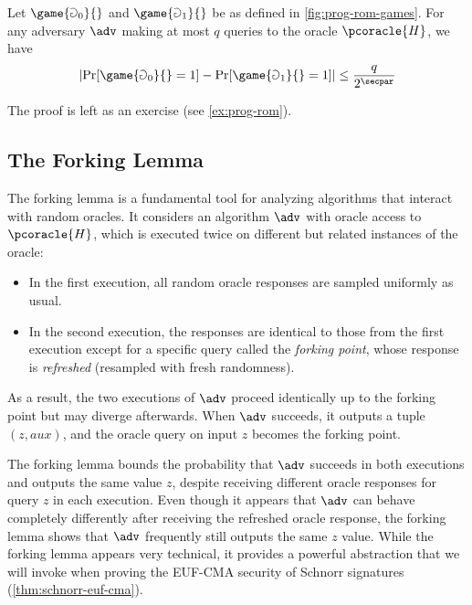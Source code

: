 \begin{proposition}\label{prop:prog-rom}
  Let $\game{\Game_0}{}$ and $\game{\Game_1}{}$ be as defined in \autoref{fig:prog-rom-games}.
  For any adversary $\adv$ making at most $q$ queries to the oracle $\pcoracle{H}$, we have
  \[
  \left|\Pr[\game{\Game_0}{} = 1] - \Pr[\game{\Game_1}{} = 1]\right| \leq \frac{q}{2^\secpar}
  \]
\end{proposition}

The proof is left as an exercise (see \autoref{ex:prog-rom}).

\subsection{The Forking Lemma}

The forking lemma is a fundamental tool for analyzing algorithms that interact with random oracles.
It considers an algorithm $\adv$ with oracle access to $\pcoracle{H}$, which is executed twice on different but related instances of the oracle:

\begin{itemize}
  \item In the first execution, all random oracle responses are sampled uniformly as usual.
  \item In the second execution, the responses are identical to those from the first execution except for a specific query called the \emph{forking point}, whose response is \emph{refreshed} (resampled with fresh randomness).
\end{itemize}
As a result, the two executions of $\adv$ proceed identically up to the forking point but may diverge afterwards.
When $\adv$ succeeds, it outputs a tuple $(z, \mathit{aux})$, and the oracle query on input $z$ becomes the forking point.

The forking lemma bounds the probability that $\adv$ succeeds in both executions and outputs the same value $z$, despite receiving different oracle responses for query $z$ in each execution.
Even though it appears that $\adv$ can behave completely differently after receiving the refreshed oracle response, the forking lemma shows that $\adv$ frequently still outputs the same $z$ value.
While the forking lemma appears very technical, it provides a powerful abstraction that we will invoke when proving the EUF-CMA security of Schnorr signatures (\autoref{thm:schnorr-euf-cma}).

